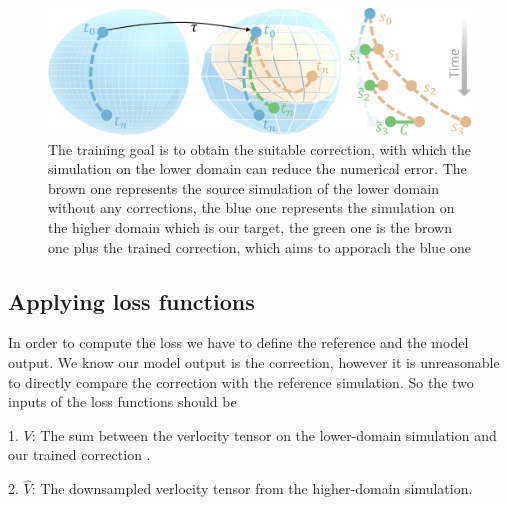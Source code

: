 \documentclass[a4paper,12pt,twoside]{report}
\begin{document}
\begin{figure}
\centering
\includegraphics[width=1.0\textwidth]{Manifolds.pdf}
\caption{The training goal is to obtain the suitable correction, with which the simulation on the lower domain can reduce the numerical error. The brown one represents the source simulation of the lower domain without any corrections, the blue one represents the simulation on the higher domain which is our target, the green one is the brown one plus the trained correction, which aims to apporach the blue one\cite{um2020sol}}
\end{figure}

\subsection{Applying loss functions}
In order to compute the loss we have to define the reference and the model output. We know our model output is the correction, however it is unreasonable to directly compare the correction with the reference simulation. So the two inputs of the loss functions should be 

1. $V$: The sum between the verlocity tensor on the lower-domain simulation and our trained correction .

2. $\hat{V}$: The downsampled verlocity tensor from the higher-domain simulation.
\end{document}
